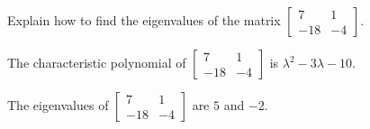 
\begin{exerciseStatement}


Explain how to find the eigenvalues of the matrix \( \left[\begin{array}{cc}
7 & 1 \\
-18 & -4
\end{array}\right] \).


\end{exerciseStatement}
    
\begin{exerciseAnswer} 


The characteristic polynomial of \( \left[\begin{array}{cc}
7 & 1 \\
-18 & -4
\end{array}\right] \) is \( \lambda^{2} - 3 \lambda - 10 \).



The eigenvalues of \( \left[\begin{array}{cc}
7 & 1 \\
-18 & -4
\end{array}\right] \) are \( 5 \) and \( -2 \).


\end{exerciseAnswer}
    
